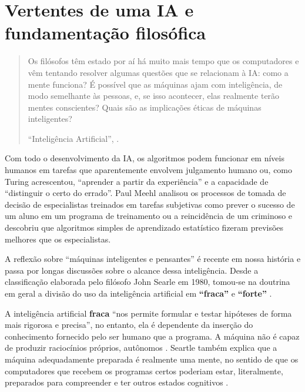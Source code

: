 \documentclass[
  openany]{book}
\begin{document}
\hypertarget{vertentes-de-uma-ia-e-fundamentauxe7uxe3o-filosuxf3fica}{%
\section{Vertentes de uma IA e fundamentação filosófica}\label{vertentes-de-uma-ia-e-fundamentauxe7uxe3o-filosuxf3fica}}

\begin{quote}
Os filósofos têm estado por aí há muito mais tempo que os computadores e vêm tentando resolver algumas questões que se relacionam à IA: como a mente funciona? É possível que as máquinas ajam com inteligência, de modo semelhante às pessoas, e, se isso acontecer, elas realmente terão mentes conscientes? Quais são as implicações éticas de máquinas inteligentes?

``Inteligência Artificial'', \citet{russel2013inteligencia}.
\end{quote}

Com todo o desenvolvimento da IA, os algoritmos podem funcionar em níveis
humanos em tarefas que aparentemente envolvem julgamento humano ou, como Turing acrescentou,
``aprender a partir da experiência'' e a capacidade de ``distinguir o certo do errado''\citep{russel2013inteligencia}. Paul Meehl \citep{meehl1954clinical} analisou os processos de tomada de decisão de especialistas treinados em tarefas subjetivas como prever o sucesso de um aluno em um programa de
treinamento ou a reincidência de um criminoso e descobriu que algoritmos simples de aprendizado estatístico fizeram previsões melhores que os especialistas.

A reflexão sobre ``máquinas inteligentes e pensantes'' é recente em nossa história e passa por longas discussões sobre o alcance dessa inteligência. Desde a classificação elaborada pelo filósofo John Searle em 1980, tomou-se na doutrina em geral a divisão do uso da inteligência
artificial em \textbf{``fraca''} e \textbf{``forte''} \citep{searle1980minds}.

A inteligência artificial \textbf{fraca} ``nos permite formular e testar hipóteses de forma mais rigorosa e precisa'', no entanto, ela é dependente da inserção do conhecimento fornecido pelo ser humano que a programa. A máquina não é capaz de produzir raciocínios próprios, autônomos \citep{searle1980minds, guimaraes2019inteligencia}. Seartle também explica que a máquina adequadamente preparada é realmente uma
mente, no sentido de que os computadores que recebem os programas certos poderiam estar, literalmente, preparados para compreender e ter outros estados cognitivos \citep{searle1980minds}.
\end{document}
